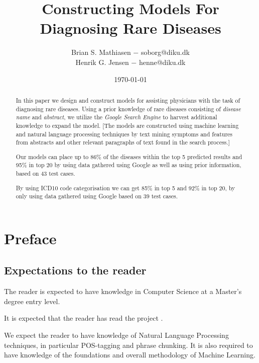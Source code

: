\documentclass[10pt,letterpaper,final]{article}
\title{Constructing Models For Diagnosing Rare Diseases}
\author{Brian S. Mathiasen $-$ soborg@diku.dk \\
        Henrik G. Jensen $-$ henne@diku.dk\\
}
\date{\today} %
\begin{document}
\maketitle


\begin{abstract}
In this paper we design and construct models for assisting physicians
with the task of diagnosing rare diseases. Using a prior knowledge of
rare diseases consisting of \textit{disease name} and \textit{abstract},
we utilize the \textit{Google Search Engine} to harvest additional
knowledge to expand the model. [The models are constructed using machine
learning and natural language processing techniques by text mining
symptoms and features from abstracts and other relevant paragraphs of
text found in the search process.]

Our models can place up to 86\% of the diseases within the top 5
predicted results and 95\% in top 20 by using data gathered using Google
as well as using prior information, based on 43 test cases.

By using ICD10 code categorisation we can get 85\% in top 5 and 92\% in
top 20, by only using data gathered using Google based on 39 test cases.

\end{abstract}

\section{Preface}
\subsection{Expectations to the reader}
The reader is expected to have knowledge in Computer Science at a
Master's degree entry level.

It is expected that the reader has read the project
\cite{jensenandersen}.

We expect the reader to have knowledge of Natural Language Processing
techniques, in particular POS-tagging and phrase chunking. It is also
required to have knowledge of the foundations and overall methodology of
Machine Learning.
\end{document}
